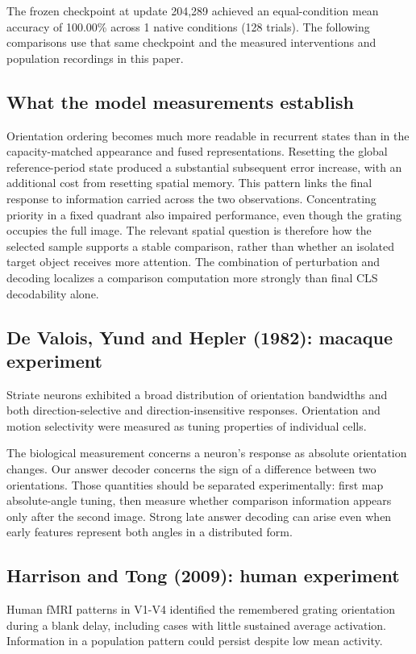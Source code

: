 \documentclass[11pt]{article}
\begin{document}
The frozen checkpoint at update 204,289 achieved an equal-condition mean accuracy of 100.00\% across 1 native conditions (128 trials). The following comparisons use that same checkpoint and the measured interventions and population recordings in this paper.

\subsection{What the model measurements establish}
Orientation ordering becomes much more readable in recurrent states than in the capacity-matched appearance and fused representations. Resetting the global reference-period state produced a substantial subsequent error increase, with an additional cost from resetting spatial memory. This pattern links the final response to information carried across the two observations. Concentrating priority in a fixed quadrant also impaired performance, even though the grating occupies the full image. The relevant spatial question is therefore how the selected sample supports a stable comparison, rather than whether an isolated target object receives more attention. The combination of perturbation and decoding localizes a comparison computation more strongly than final CLS decodability alone.

\subsection{De Valois, Yund and Hepler (1982): macaque experiment}
Striate neurons exhibited a broad distribution of orientation bandwidths and both direction-selective and direction-insensitive responses. Orientation and motion selectivity were measured as tuning properties of individual cells. \cite{bio_devalois_o}

The biological measurement concerns a neuron’s response as absolute orientation changes. Our answer decoder concerns the sign of a difference between two orientations. Those quantities should be separated experimentally: first map absolute-angle tuning, then measure whether comparison information appears only after the second image. Strong late answer decoding can arise even when early features represent both angles in a distributed form.

\subsection{Harrison and Tong (2009): human experiment}
Human fMRI patterns in V1-V4 identified the remembered grating orientation during a blank delay, including cases with little sustained average activation. Information in a population pattern could persist despite low mean activity. \cite{bio_harrison}
\end{document}
